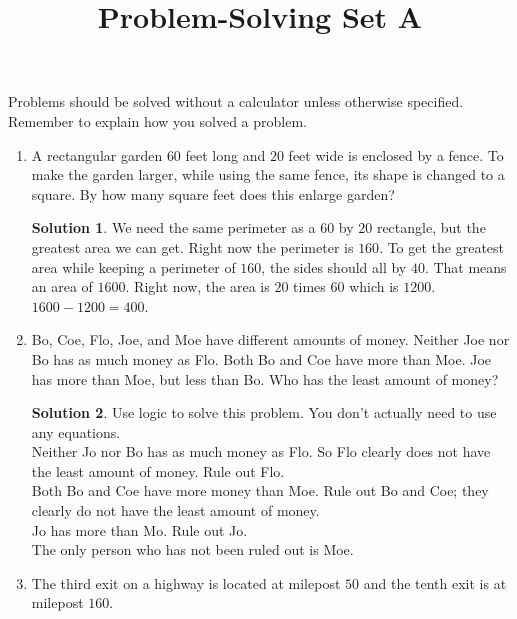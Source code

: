 \documentclass{article}
\title{Problem-Solving Set A}
\author{}
\date{}
\theoremstyle{definition}
\newtheorem*{solution}{Solution}
\begin{document}
\maketitle
\noindent Problems should be solved without a calculator unless otherwise specified.
Remember to explain how you solved a problem.
\begin{multicols}{2}
    \begin{enumerate}
        \item A rectangular garden $60$ feet long and $20$ feet wide is enclosed by a fence.
            To make the garden larger, while using the same fence, its shape is changed to a square.
            By how many square feet does this enlarge garden?
            \begin{solution}
                We need the same perimeter as a $60$ by $20$ rectangle, but the greatest area we can get.
                Right now the perimeter is $160$.
                To get the greatest area while keeping a perimeter of $160$, the sides should all by $40$.
                That means an area of $1600$.
                Right now, the area is $20$ times $60$ which is $1200$.
                $1600 - 1200 = 400$.
            \end{solution}
        \item Bo, Coe, Flo, Joe, and Moe have different amounts of money.
            Neither Joe nor Bo has as much money as Flo.
            Both Bo and Coe have more than Moe.
            Joe has more than Moe, but less than Bo.
            Who has the least amount of money?
            \begin{solution}
                Use logic to solve this problem.
                You don't actually need to use any equations. \\
                Neither Jo nor Bo has as much money as Flo.
                So Flo clearly does not have the least amount of money.
                Rule out Flo. \\
                Both Bo and Coe have more money than Moe.
                Rule out Bo and Coe; they clearly do not have the least amount of money. \\
                Jo has more than Mo.
                Rule out Jo. \\
                The only person who has not been ruled out is Moe.
            \end{solution}
        \item The third exit on a highway is located at milepost $50$ and the tenth exit is at milepost $160$.

\end{enumerate}
\end{multicols}
\end{document}
